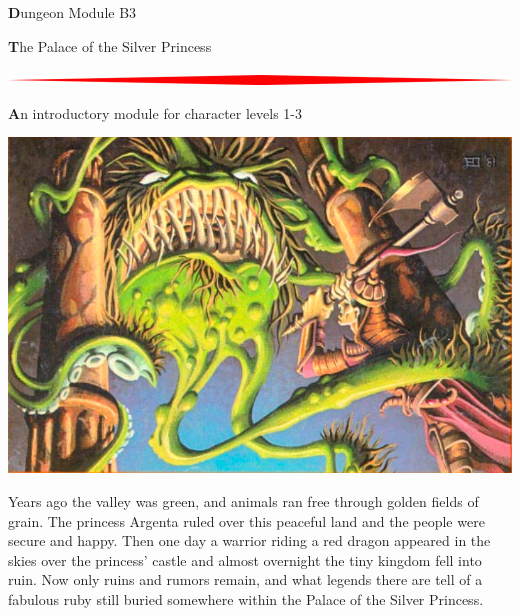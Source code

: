 \documentclass[10pt,twoside,twocolumn]{article}
\begin{document}
\selectfont %



\begin{titlepage}  \begin{onecolumn}
\begin{center}
	{\Huge \textbf Dungeon Module B3}

	{\Huge \textbf The Palace of the Silver Princess}
	
	\vspace{0.5cm}
	\includegraphics[width=\textwidth]{img/hr.jpg}
	
	\vspace{0.5cm}
	{\Large \textbf An introductory module for character levels 1-3}
	
	\vspace{0.5cm}
	\includegraphics[width=\textwidth]{img/cover.png}
	
	\vspace{0.5cm}
	Years ago the valley was green, and animals ran free through golden
	fields of grain. The princess Argenta ruled over this peaceful land
	and the people were secure and happy. Then one day a warrior riding
	a red dragon appeared in the skies over the princess’ castle and
	almost overnight the tiny kingdom fell into ruin. Now only ruins and
	rumors remain, and what legends there are tell of a fabulous ruby
	still buried somewhere within the Palace of the Silver Princess.


\end{center}
\end{onecolumn}
\end{titlepage}
\end{document}
